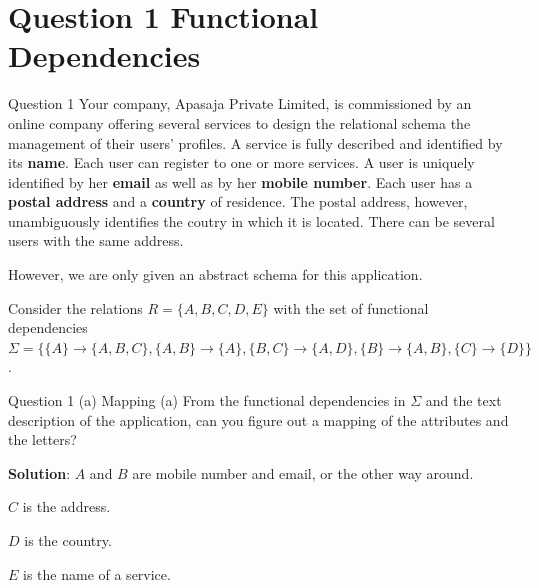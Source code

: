\newcommand{\boss}[1]{\textcolor{red}{#1}}

\section*{Question 1 Functional Dependencies}

\begin{frame}[fragile]{Question 1}
Your company, Apasaja Private Limited, is commissioned by an online company offering several services to design the relational schema the management of their users' profiles. A service is fully described and identified by its \textbf{name}. Each user can register to one or more services. A user is uniquely identified by her \textbf{email} as well as by her \textbf{mobile number}. Each user has a \textbf{postal address} and a \textbf{country} of residence. The postal address, however, unambiguously identifies the coutry in which it is located. There can be several users with the same address.\vspace{5pt}

However, we are only given an abstract schema for this application. \vspace{5pt}

Consider the relations $R=\{A, B, C, D, E\}$ with the set of functional dependencies $\Sigma=\{\{A\} \rightarrow \{A, B, C\}, \{A, B\} \rightarrow \{A\}, \{B, C\} \rightarrow \{A, D\}, \{B\} \rightarrow \{A, B\}, \{C\} \rightarrow \{D\}\}$.\vspace{5pt}
\end{frame}

\begin{frame}[fragile]{Question 1 (a) Mapping}
(a) From the functional dependencies in $\Sigma$ and the text description of the application, can you figure out a mapping of the attributes and the letters? \vspace{15pt}

\textbf{Solution}: $A$ and $B$ are mobile number and email, or the other way around.\vspace{5pt}

$C$ is the address.\vspace{5pt}

$D$ is the country.\vspace{5pt}

$E$ is the name of a service.\vspace{5pt}
\end{frame}

